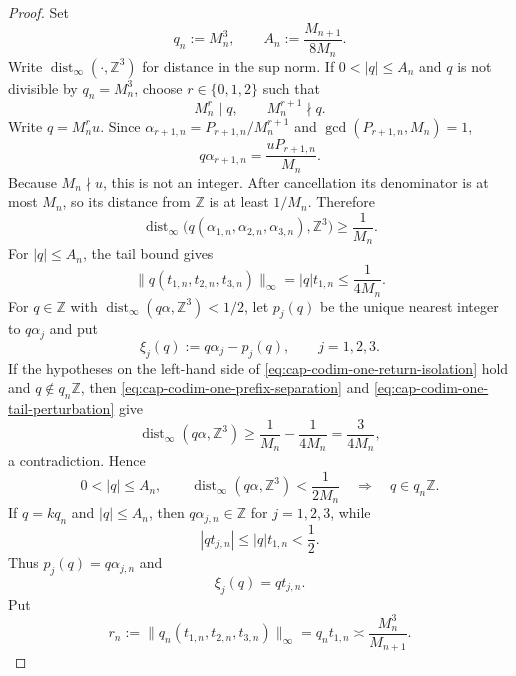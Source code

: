 \documentclass[11pt,reqno,a4paper]{amsart}
\numberwithin{equation}{section}
\theoremstyle{compact}
\theoremstyle{definition}
\theoremstyle{definition}
\begin{document}
\begin{proof}
Set
\begin{equation}\label{eq:cap-codim-one-qA}
  q_n:=M_n^3,
  \qquad
  A_n:=\frac{M_{n+1}}{8M_n}.
\end{equation}
Write $\operatorname{dist}_\infty(\cdot,\mathbb Z^3)$ for distance in the
sup norm.  If $0<|q|\leq A_n$ and $q$ is not divisible by $q_n=M_n^3$, choose
$r\in\{0,1,2\}$ such that
\[
  M_n^r\mid q,
  \qquad
  M_n^{r+1}\nmid q.
\]
Write $q=M_n^r u$.  Since
$\alpha_{r+1,n}=P_{r+1,n}/M_n^{r+1}$ and
$\gcd(P_{r+1,n},M_n)=1$,
\[
  q\alpha_{r+1,n}=\frac{uP_{r+1,n}}{M_n}.
\]
Because $M_n\nmid u$, this is not an integer.  After cancellation its
denominator is at most $M_n$, so its distance from $\mathbb Z$ is at least
$1/M_n$.  Therefore
\begin{equation}\label{eq:cap-codim-one-prefix-separation}
  \operatorname{dist}_\infty
  \bigl(q(\alpha_{1,n},\alpha_{2,n},\alpha_{3,n}),\mathbb Z^3\bigr)
  \geq\frac1{M_n}.
\end{equation}
For $|q|\leq A_n$, the tail bound gives
\begin{equation}\label{eq:cap-codim-one-tail-perturbation}
  \|q(t_{1,n},t_{2,n},t_{3,n})\|_\infty
  =|q|t_{1,n}
  \leq\frac1{4M_n}.
\end{equation}
For $q\in\mathbb Z$ with
$\operatorname{dist}_\infty(q\alpha,\mathbb Z^3)<1/2$, let $p_j(q)$ be the
unique nearest integer to $q\alpha_j$ and put
\begin{equation}\label{eq:cap-codim-one-return-coordinate-definition}
  \xi_j(q):=q\alpha_j-p_j(q),\qquad j=1,2,3.
\end{equation}
If the hypotheses on the left-hand side of
\eqref{eq:cap-codim-one-return-isolation} hold and $q\notin q_n\mathbb Z$,
then \eqref{eq:cap-codim-one-prefix-separation} and
\eqref{eq:cap-codim-one-tail-perturbation} give
\[
  \operatorname{dist}_\infty(q\alpha,\mathbb Z^3)
  \geq \frac1{M_n}-\frac1{4M_n}
  =\frac3{4M_n},
\]
a contradiction.  Hence
\begin{equation}\label{eq:cap-codim-one-return-isolation}
  0<|q|\leq A_n,
  \qquad
  \operatorname{dist}_\infty(q\alpha,\mathbb Z^3)<\frac1{2M_n}
  \quad\Longrightarrow\quad
  q\in q_n\mathbb Z.
\end{equation}
If $q=kq_n$ and $|q|\leq A_n$, then $q\alpha_{j,n}\in\mathbb Z$ for
$j=1,2,3$, while
\[
  |qt_{j,n}|\leq |q|t_{1,n}<\frac12.
\]
Thus $p_j(q)=q\alpha_{j,n}$ and
\begin{equation}\label{eq:cap-codim-one-special-return}
  \xi_j(q)=qt_{j,n}.
\end{equation}
Put
\begin{equation}\label{eq:cap-codim-one-rn}
  r_n:=\|q_n(t_{1,n},t_{2,n},t_{3,n})\|_\infty
  =q_nt_{1,n}
  \asymp\frac{M_n^3}{M_{n+1}}.
\end{equation}


\end{proof}
\end{document}
